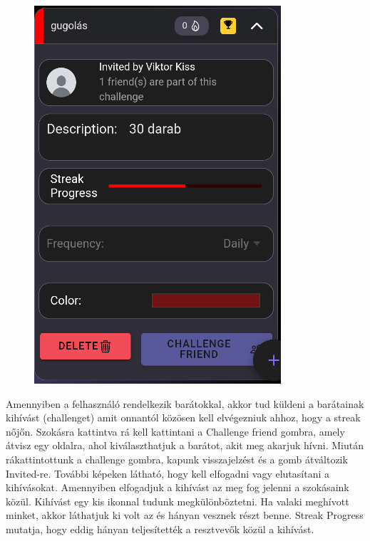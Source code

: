 \documentclass[12pt]{report}
\begin{document}
\begin{figure}[H]
\begin{minipage}[b]{0.3\textwidth}
        \includegraphics[width=\linewidth]{src/challenge8.png}

    \end{minipage}
\end{figure}
    \footnotesize Amennyiben a felhasználó rendelkezik barátokkal, akkor tud küldeni a barátainak kihívást (challenget) amit onnantól közösen kell elvégezniuk ahhoz, hogy a streak nőjőn. Szokásra kattintva rá kell kattintani a Challenge friend gombra, amely átvisz egy oldalra, ahol kiválaszthatjuk a barátot, akit meg akarjuk hívni. Miután rákattintottunk a challenge gombra, kapunk visszajelzést és a gomb átváltozik Invited-re. További képeken látható, hogy kell elfogadni vagy elutasítani a kihívásokat. Amennyiben elfogadjuk a kihívást az meg fog jelenni a szokásaink közül. Kihívást egy kis ikonnal tudunk megkülönböztetni. Ha valaki meghívott minket, akkor láthatjuk ki volt az és hányan vesznek részt benne. Streak Progress mutatja, hogy eddig hányan teljesítették a resztvevők közül a kihívást.
\end{document}
